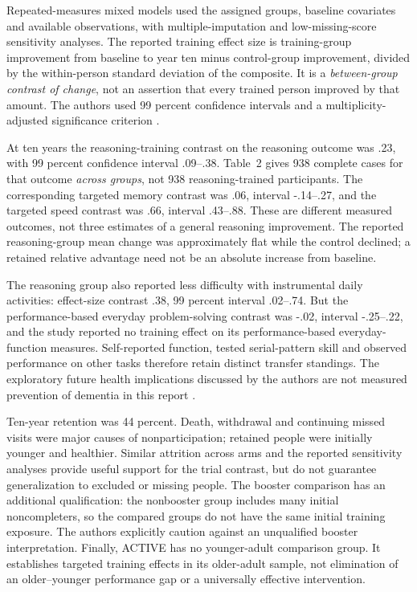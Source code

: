 Repeated-measures mixed models used the assigned groups, baseline
covariates and available observations, with multiple-imputation and
low-missing-score sensitivity analyses. The reported training effect size
is training-group improvement from baseline to year ten minus
control-group improvement, divided by the within-person standard
deviation of the composite. It is a \emph{between-group contrast of
change}, not an assertion that every trained person improved by that
amount. The authors used 99 percent confidence intervals and a
multiplicity-adjusted significance criterion
\cite[Methods and table~2]{RebokEtAl2014ACTIVE}.

At ten years the reasoning-training contrast on the reasoning outcome
was .23, with 99 percent confidence interval .09--.38. Table~2 gives
938 complete cases for that outcome \emph{across groups}, not 938
reasoning-trained participants. The corresponding targeted memory
contrast was .06, interval -.14--.27, and the targeted speed contrast
was .66, interval .43--.88. These are different measured outcomes, not
three estimates of a general reasoning improvement. The reported
reasoning-group mean change was approximately flat while the control
declined; a retained relative advantage need not be an absolute increase
from baseline.

The reasoning group also reported less difficulty with instrumental
daily activities: effect-size contrast .38, 99 percent interval .02--.74.
But the performance-based everyday problem-solving contrast was -.02,
interval -.25--.22, and the study reported no training effect on its
performance-based everyday-function measures. Self-reported function,
tested serial-pattern skill and observed performance on other tasks
therefore retain distinct transfer standings. The exploratory future
health implications discussed by the authors are not measured prevention
of dementia in this report \cite[table~2 and Discussion]{RebokEtAl2014ACTIVE}.

Ten-year retention was 44 percent. Death, withdrawal and continuing
missed visits were major causes of nonparticipation; retained people
were initially younger and healthier. Similar attrition across arms and
the reported sensitivity analyses provide useful support for the trial
contrast, but do not guarantee generalization to excluded or missing
people. The booster comparison has an additional qualification: the
nonbooster group includes many initial noncompleters, so the compared
groups do not have the same initial training exposure. The authors
explicitly caution against an unqualified booster interpretation.
Finally, ACTIVE has no younger-adult comparison group. It establishes
targeted training effects in its older-adult sample, not elimination of
an older--younger performance gap or a universally effective intervention.

